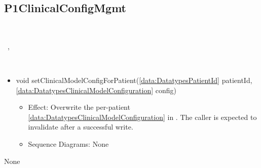   \subsection{P1ClinicalConfigMgmt}\label{int:InterfacesP1ClinicalConfigMgmt}
    \begin{description}
      \item[Provided by:] \iconcomponent{}~
      \item[Required by:] \iconcomponent{}~, \iconcomponent{}~ 
      \item[Operations:] ~
    \begin{itemize}[noitemsep,nolistsep,leftmargin=-.25cm]
      \item \textsf{void setClinicalModelConfigForPatient(\ref{data:DatatypesPatientId} patientId, \ref{data:DatatypesClinicalModelConfiguration} config)}
        \begin{itemize}[noitemsep,nolistsep]
           \item Effect: Overwrite the per-patient \ref{data:DatatypesClinicalModelConfiguration} in . The caller is expected to invalidate  after a successful write. 
           \item Sequence Diagrams: None
        \end{itemize}
    \end{itemize}
      \item[Diagrams:] None
    \end{description}


